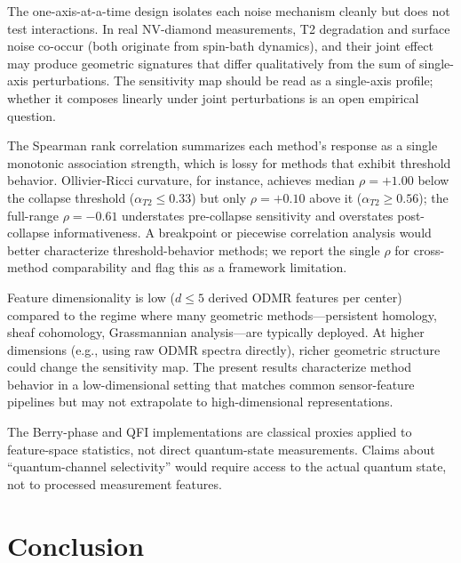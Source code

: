 \documentclass[11pt]{article}
\begin{document}
The one-axis-at-a-time design isolates each noise mechanism cleanly but
does not test interactions.  In real NV-diamond measurements, T2
degradation and surface noise co-occur (both originate from spin-bath
dynamics), and their joint effect may produce geometric signatures that
differ qualitatively from the sum of single-axis perturbations.  The
sensitivity map should be read as a single-axis profile; whether it
composes linearly under joint perturbations is an open empirical
question.

The Spearman rank correlation summarizes each method's response as a
single monotonic association strength, which is lossy for methods that
exhibit threshold behavior.  Ollivier-Ricci curvature, for instance,
achieves median $\rho = +1.00$ below the collapse threshold
($\alpha_{T2} \leq 0.33$) but only $\rho = +0.10$ above it
($\alpha_{T2} \geq 0.56$); the full-range $\rho = -0.61$ understates
pre-collapse sensitivity and
overstates post-collapse informativeness.  A breakpoint or piecewise
correlation analysis would better characterize threshold-behavior
methods; we report the single $\rho$ for cross-method comparability and
flag this as a framework limitation.

Feature dimensionality is low ($d \leq 5$ derived ODMR features per
center) compared to the regime where many geometric methods---persistent
homology, sheaf cohomology, Grassmannian analysis---are typically
deployed.  At higher dimensions (e.g., using raw ODMR spectra directly),
richer geometric structure could change the sensitivity map.  The
present results characterize method behavior in a low-dimensional
setting that matches common sensor-feature pipelines but may not
extrapolate to high-dimensional representations.

The Berry-phase and QFI implementations are classical proxies applied to
feature-space statistics, not direct quantum-state measurements.  Claims
about ``quantum-channel selectivity'' would require access to the actual
quantum state, not to processed measurement features.

\section{Conclusion}
\label{sec:conclusion}
\end{document}

